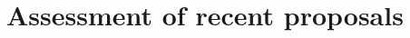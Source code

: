 \documentclass[aspectratio=169,xcolor=dvipsnames, 11pt,mathserif]{beamer}
\newcommand{\figpath}{../paper/figures}
\begin{document}


\section{Assessment of recent proposals}
\end{document}
